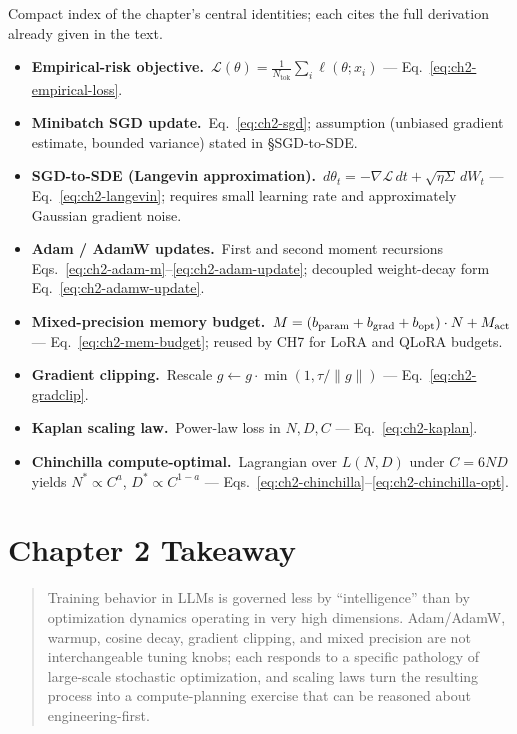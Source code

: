 \begin{derivledger}
Compact index of the chapter's central identities; each cites the full
derivation already given in the text.
\begin{itemize}
  \item \textbf{Empirical-risk objective.}\
        $\mathcal{L}(\theta) = \tfrac{1}{N_{\mathrm{tok}}} \sum_i \ell(\theta; x_i)$
        --- Eq.~\eqref{eq:ch2-empirical-loss}.
  \item \textbf{Minibatch SGD update.}\
        Eq.~\eqref{eq:ch2-sgd}; assumption (unbiased gradient
        estimate, bounded variance) stated in §SGD-to-SDE.
  \item \textbf{SGD-to-SDE (Langevin approximation).}\
        $d\theta_t = -\nabla \mathcal{L}\, dt + \sqrt{\eta \Sigma}\, dW_t$
        --- Eq.~\eqref{eq:ch2-langevin}; requires small learning rate
        and approximately Gaussian gradient noise.
  \item \textbf{Adam / AdamW updates.}\
        First and second moment recursions
        Eqs.~\eqref{eq:ch2-adam-m}--\eqref{eq:ch2-adam-update};
        decoupled weight-decay form Eq.~\eqref{eq:ch2-adamw-update}.
  \item \textbf{Mixed-precision memory budget.}\
        $M = (b_{\rm param} + b_{\rm grad} + b_{\rm opt}) \cdot N + M_{\rm act}$
        --- Eq.~\eqref{eq:ch2-mem-budget}; reused by CH7 for LoRA and
        QLoRA budgets.
  \item \textbf{Gradient clipping.}\
        Rescale $g \leftarrow g \cdot \min(1, \tau / \|g\|)$
        --- Eq.~\eqref{eq:ch2-gradclip}.
  \item \textbf{Kaplan scaling law.}\
        Power-law loss in $N, D, C$ --- Eq.~\eqref{eq:ch2-kaplan}.
  \item \textbf{Chinchilla compute-optimal.}\
        Lagrangian over $L(N,D)$ under $C = 6ND$ yields
        $N^* \propto C^a$, $D^* \propto C^{1-a}$
        --- Eqs.~\eqref{eq:ch2-chinchilla}--\eqref{eq:ch2-chinchilla-opt}.
\end{itemize}
\end{derivledger}

\section{Chapter 2 Takeaway}

\begin{quote}
Training behavior in LLMs is governed less by ``intelligence'' than by
optimization dynamics operating in very high dimensions. Adam/AdamW,
warmup, cosine decay, gradient clipping, and mixed precision are not
interchangeable tuning knobs; each responds to a specific pathology of
large-scale stochastic optimization, and scaling laws turn the resulting
process into a compute-planning exercise that can be reasoned about
engineering-first.
\end{quote}
